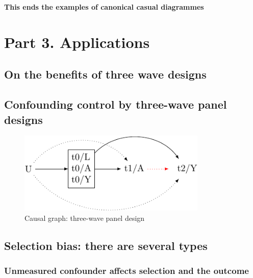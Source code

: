 \documentclass[
  singlecolumn]{report}
\begin{document}
\textbf{This ends the examples of canonical casual diagrammes}

\hypertarget{part-3.-applications}{%
\section{Part 3. Applications}\label{part-3.-applications}}

\hypertarget{on-the-benefits-of-three-wave-designs}{%
\subsection{On the benefits of three wave
designs}\label{on-the-benefits-of-three-wave-designs}}

\hypertarget{confounding-control-by-three-wave-panel-designs}{%
\subsection{Confounding control by three-wave panel
designs}\label{confounding-control-by-three-wave-panel-designs}}

\begin{figure}

{\centering \includegraphics[width=0.8\textwidth,height=\textheight]{causal-dags_files/figure-pdf/fig-dag-6-1.pdf}

}

\caption{\label{fig-dag-6}Causal graph: three-wave panel design}

\end{figure}

\hypertarget{selection-bias-there-are-several-types}{%
\subsection{Selection bias: there are several
types}\label{selection-bias-there-are-several-types}}

\hypertarget{unmeasured-confounder-affects-selection-and-the-outcome}{%
\subsubsection{Unmeasured confounder affects selection and the
outcome}\label{unmeasured-confounder-affects-selection-and-the-outcome}}
\end{document}
